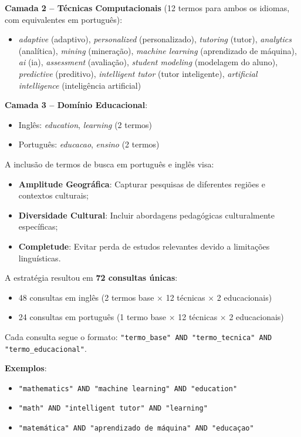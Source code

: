 \textbf{Camada 2 -- Técnicas Computacionais} (12 termos para ambos os idiomas, com equivalentes em português):
\begin{itemize}
    \item \textit{adaptive} (adaptivo), \textit{personalized} (personalizado), \textit{tutoring} (tutor), \textit{analytics} (analítica), \textit{mining} (mineração), \textit{machine learning} (aprendizado de máquina), \textit{ai} (ia), \textit{assessment} (avaliação), \textit{student modeling} (modelagem do aluno), \textit{predictive} (preditivo), \textit{intelligent tutor} (tutor inteligente), \textit{artificial intelligence} (inteligência artificial)
\end{itemize}

\textbf{Camada 3 -- Domínio Educacional}:
\begin{itemize}
    \item Inglês: \textit{education}, \textit{learning} (2 termos)
    \item Português: \textit{educacao}, \textit{ensino} (2 termos)
\end{itemize}

A inclusão de termos de busca em português e inglês visa:

\begin{itemize}
    \item \textbf{Amplitude Geográfica}: Capturar pesquisas de diferentes regiões e contextos culturais;
    \item \textbf{Diversidade Cultural}: Incluir abordagens pedagógicas culturalmente específicas;
    \item \textbf{Completude}: Evitar perda de estudos relevantes devido a limitações linguísticas.
\end{itemize}

A estratégia resultou em \textbf{72 consultas únicas}:
\begin{itemize}
    \item 48 consultas em inglês (2 termos base $\times$ 12 técnicas $\times$ 2 educacionais)
    \item 24 consultas em português (1 termo base $\times$ 12 técnicas $\times$ 2 educacionais)
\end{itemize}

Cada consulta segue o formato: \texttt{"termo\_base" AND "termo\_tecnica" AND "termo\_educacional"}. 

\textbf{Exemplos}:
\begin{itemize}
    \item \texttt{"mathematics" AND "machine learning" AND "education"}
    \item \texttt{"math" AND "intelligent tutor" AND "learning"}
    \item \texttt{"matemática" AND "aprendizado de máquina" AND "educa\c{c}ao"}
\end{itemize}

